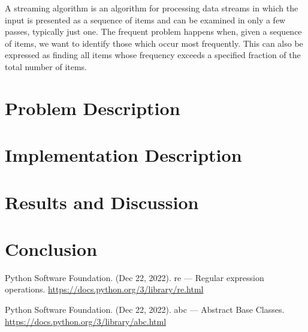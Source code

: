 \documentclass[...]{revdetua}
\begin{document}
A streaming algorithm is an algorithm for processing data streams in which the input is presented as a sequence of items and can be examined in only a few passes, typically just one.
The frequent problem happens when, given a sequence of items, we want to identify those which occur most frequently. This can also be expressed as finding all items whose frequency exceeds a specified fraction of the total number of items.

\section{Problem Description}


\section{Implementation Description}


\section{Results and Discussion}


\section{Conclusion}


\begin{thebibliography}{9}


% 

Python Software Foundation. (Dec 22, 2022). re — Regular expression operations. \url{https://docs.python.org/3/library/re.html}

Python Software Foundation. (Dec 22, 2022). abc — Abstract Base Classes. \url{https://docs.python.org/3/library/abc.html}

\end{thebibliography}


\end{document}
